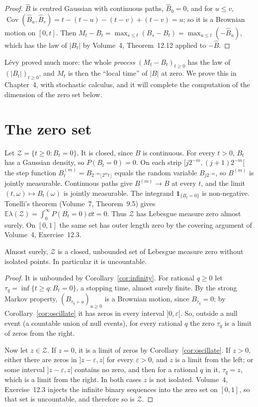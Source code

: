 \begin{proof}
$\hat B$ is centred Gaussian with continuous paths, $\hat B_0=0$, and for $u\le v$, $\operatorname{Cov}(\hat B_u,\hat B_v)=t-(t-u)-(t-v)+(t-v)=u$; so it is a Brownian motion on $[0,t]$. Then
$M_t-B_t=\max_{s\le t}(B_s-B_t)=\max_{u\le t}(-\hat B_u)$, which has the law of $|B_t|$ by Volume~4, Theorem~12.12 applied to $-\hat B$.
\end{proof}

L\'evy proved much more: the whole \emph{process} $(M_t-B_t)_{t\ge0}$ has the law of $(|B_t|)_{t\ge0}$, and $M_t$ is then the ``local time'' of $|B|$ at zero. We prove this in Chapter~4, with
stochastic calculus, and it will complete the computation of the dimension of the zero set below.

\section{The zero set}

Let $\mathcal Z=\{t\ge0:B_t=0\}$. It is closed, since $B$ is continuous. For every $t>0$, $B_t$ has a Gaussian density, so $P(B_t=0)=0$. On each strip $[j2^{-m},(j+1)2^{-m}[$ the step function $B^{(m)}_t=B_{2^{-m}\lfloor 2^m t\rfloor}$ equals the random variable $B_{j2^{-m}}$, so $B^{(m)}$ is jointly measurable. Continuous paths give $B^{(m)}\to B$ at every $t$, and the limit $(t,\omega)\mapsto B_t(\omega)$ is jointly measurable. The integrand $\mathbf1_{\{B_t=0\}}$ is non-negative. Tonelli's theorem (Volume~7, Theorem~9.5) gives $\mathbb E\lambda(\mathcal Z)=\int_0^\infty P(B_t=0)\dd t=0$. Thus $\mathcal Z$ has Lebesgue measure zero almost surely. On $[0,1]$ the same set has outer length zero by the covering argument of Volume~4, Exercise~12.3.

\begin{theorem}\label{thm:zeroset}
Almost surely, $\mathcal Z$ is a closed, unbounded set of Lebesgue measure zero without isolated points. In particular it is uncountable.
\end{theorem}

\begin{proof}
It is unbounded by Corollary~\ref{cor:infinity}. For rational $q\ge0$ let $\tau_q=\inf\{t\ge q:B_t=0\}$, a stopping time, almost surely finite. By the strong Markov property, $(B_{\tau_q+u})_{u\ge0}$ is a
Brownian motion, since $B_{\tau_q}=0$; by Corollary~\ref{cor:oscillate} it has zeros in every interval $]0,\varepsilon[$. So, outside a null event (a countable union of null events), for every rational $q$ the
zero $\tau_q$ is a limit of zeros from the right.

Now let $z\in\mathcal Z$. If $z=0$, it is a limit of zeros by Corollary~\ref{cor:oscillate}. If $z>0$, either there are zeros in $]z-\varepsilon,z[$ for every $\varepsilon>0$, and $z$ is a limit from the left; or some
interval $]z-\varepsilon,z[$ contains no zero, and then for a rational $q$ in it, $\tau_q=z$, which is a limit from the right. In both cases $z$ is not isolated. Volume~4, Exercise~12.3 injects the infinite binary sequences into the zero set on $[0,1]$, so that set is uncountable, and therefore so is $\mathcal Z$.
\end{proof}

